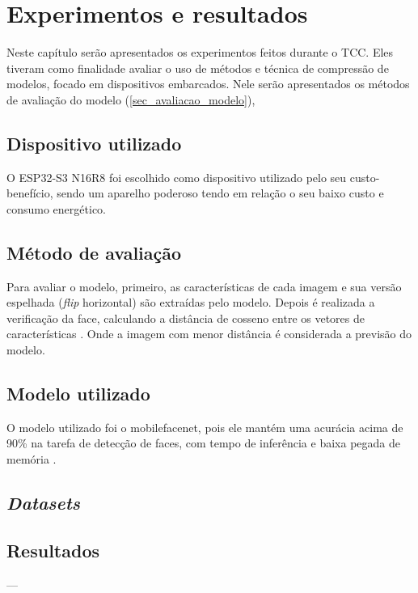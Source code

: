 \chapter{Experimentos e resultados}

Neste capítulo serão apresentados os experimentos feitos durante o TCC. Eles tiveram como
finalidade avaliar o uso de métodos e técnica de compressão de modelos, focado em dispositivos
embarcados. Nele serão apresentados os métodos de avaliação do modelo (\autoref{sec_avaliacao_modelo}),

\section{Dispositivo utilizado}\label{sec_dispositivo}
O ESP32-S3 N16R8 foi escolhido como dispositivo utilizado pelo seu custo-benefício,
sendo um aparelho poderoso tendo em relação o seu baixo custo e consumo energético.

\section{Método de avaliação}\label{sec_avaliacao_modelo}
Para avaliar o modelo, primeiro, as características de cada imagem e sua versão espelhada
(\textit{flip} horizontal) são extraídas pelo modelo. Depois é realizada a verificação da face,
calculando a distância de cosseno entre os vetores de características \cite{triplet_distillation_face_recognition}.
Onde a imagem com menor distância é considerada a previsão do modelo.

\section{Modelo utilizado}\label{sec_modelo_utilizado}
O modelo utilizado foi o mobilefacenet, pois ele mantém uma acurácia acima de 90\% na tarefa de detecção de faces,
com tempo de inferência e baixa pegada de memória \cite{leandro}.

\section{\textit{Datasets}}\label{sec_datasets}


\section{Resultados}\label{sec_resultados}

---

